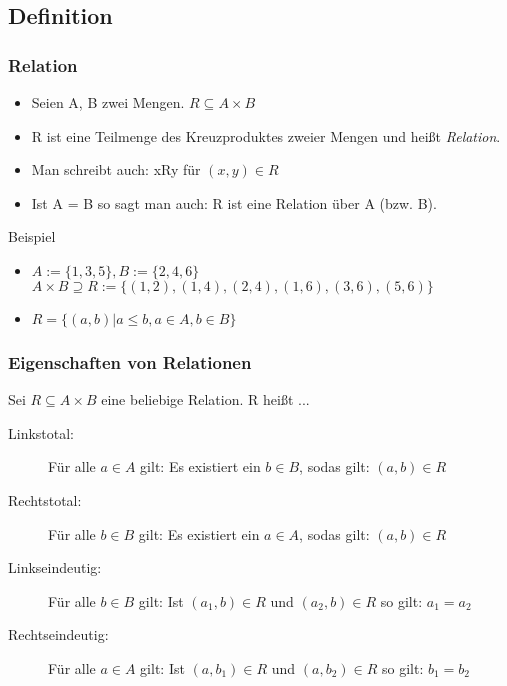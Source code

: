 \subsection{Definition}
\begin{frame}
  \frametitle{Relation}
  \begin{definition}
    \begin{itemize}
      \item Seien A, B zwei Mengen. $ R \subseteq A \times B $
      \item R ist eine Teilmenge des Kreuzproduktes zweier Mengen und heißt \emph{Relation}.
      \item Man schreibt auch: xRy für $(x, y) \in R$
      \item Ist A = B so sagt man auch: R ist eine Relation über A (bzw. B).
    \end{itemize}
  \end{definition} \pause
  \begin{exampleblock}{Beispiel}
    \begin{itemize}
    \item $ A := \{1, 3, 5\}, B := \{2, 4, 6\}$ $A \times B \supseteq R := \{(1, 2), (1, 4), (2, 4), (1, 6), (3, 6), (5, 6)\}$ \pause
    \item $ R = \{(a, b) | a \leq b, a \in A, b \in B \}$
    \end{itemize}
  \end{exampleblock}
\end{frame}
\begin{frame}
  \frametitle{Eigenschaften von Relationen}
  \begin{definition}
      Sei $R \subseteq A \times B$ eine beliebige Relation. R heißt ...
      \begin{description}
        \item[Linkstotal:] Für alle $a \in A$ gilt: Es existiert ein $b \in B$, sodas gilt: $(a, b) \in R$
        \item[Rechtstotal:] Für alle $b \in B$ gilt: Es existiert ein $a \in A$, sodas gilt: $(a, b) \in R$
        \item[Linkseindeutig:] Für alle $b \in B$ gilt: Ist $(a_1, b) \in R$ und $(a_2, b) \in R$ so gilt: $a_1 = a_2$
        \item[Rechtseindeutig:] Für alle $a \in A$ gilt: Ist $(a, b_1) \in R$ und $(a, b_2) \in R$ so gilt: $b_1 = b_2$
      \end{description}
  \end{definition}
\end{frame}
